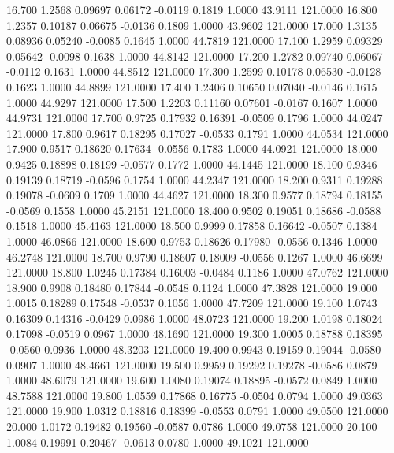   16.700   1.2568   0.09697   0.06172  -0.0119   0.1819   1.0000  43.9111 121.0000
  16.800   1.2357   0.10187   0.06675  -0.0136   0.1809   1.0000  43.9602 121.0000
  17.000   1.3135   0.08936   0.05240  -0.0085   0.1645   1.0000  44.7819 121.0000
  17.100   1.2959   0.09329   0.05642  -0.0098   0.1638   1.0000  44.8142 121.0000
  17.200   1.2782   0.09740   0.06067  -0.0112   0.1631   1.0000  44.8512 121.0000
  17.300   1.2599   0.10178   0.06530  -0.0128   0.1623   1.0000  44.8899 121.0000
  17.400   1.2406   0.10650   0.07040  -0.0146   0.1615   1.0000  44.9297 121.0000
  17.500   1.2203   0.11160   0.07601  -0.0167   0.1607   1.0000  44.9731 121.0000
  17.700   0.9725   0.17932   0.16391  -0.0509   0.1796   1.0000  44.0247 121.0000
  17.800   0.9617   0.18295   0.17027  -0.0533   0.1791   1.0000  44.0534 121.0000
  17.900   0.9517   0.18620   0.17634  -0.0556   0.1783   1.0000  44.0921 121.0000
  18.000   0.9425   0.18898   0.18199  -0.0577   0.1772   1.0000  44.1445 121.0000
  18.100   0.9346   0.19139   0.18719  -0.0596   0.1754   1.0000  44.2347 121.0000
  18.200   0.9311   0.19288   0.19078  -0.0609   0.1709   1.0000  44.4627 121.0000
  18.300   0.9577   0.18794   0.18155  -0.0569   0.1558   1.0000  45.2151 121.0000
  18.400   0.9502   0.19051   0.18686  -0.0588   0.1518   1.0000  45.4163 121.0000
  18.500   0.9999   0.17858   0.16642  -0.0507   0.1384   1.0000  46.0866 121.0000
  18.600   0.9753   0.18626   0.17980  -0.0556   0.1346   1.0000  46.2748 121.0000
  18.700   0.9790   0.18607   0.18009  -0.0556   0.1267   1.0000  46.6699 121.0000
  18.800   1.0245   0.17384   0.16003  -0.0484   0.1186   1.0000  47.0762 121.0000
  18.900   0.9908   0.18480   0.17844  -0.0548   0.1124   1.0000  47.3828 121.0000
  19.000   1.0015   0.18289   0.17548  -0.0537   0.1056   1.0000  47.7209 121.0000
  19.100   1.0743   0.16309   0.14316  -0.0429   0.0986   1.0000  48.0723 121.0000
  19.200   1.0198   0.18024   0.17098  -0.0519   0.0967   1.0000  48.1690 121.0000
  19.300   1.0005   0.18788   0.18395  -0.0560   0.0936   1.0000  48.3203 121.0000
  19.400   0.9943   0.19159   0.19044  -0.0580   0.0907   1.0000  48.4661 121.0000
  19.500   0.9959   0.19292   0.19278  -0.0586   0.0879   1.0000  48.6079 121.0000
  19.600   1.0080   0.19074   0.18895  -0.0572   0.0849   1.0000  48.7588 121.0000
  19.800   1.0559   0.17868   0.16775  -0.0504   0.0794   1.0000  49.0363 121.0000
  19.900   1.0312   0.18816   0.18399  -0.0553   0.0791   1.0000  49.0500 121.0000
  20.000   1.0172   0.19482   0.19560  -0.0587   0.0786   1.0000  49.0758 121.0000
  20.100   1.0084   0.19991   0.20467  -0.0613   0.0780   1.0000  49.1021 121.0000
